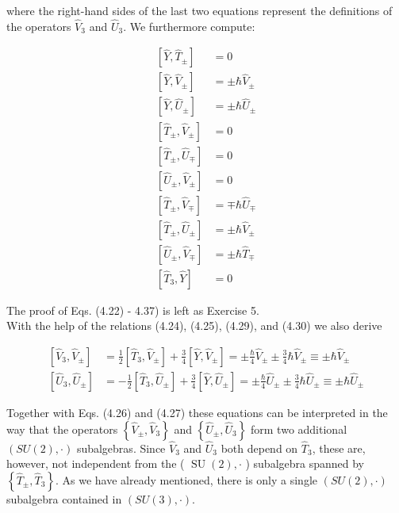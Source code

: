 \documentclass[10pt, letterpaper]{article}
\begin{document}
where the right-hand sides of the last two equations represent the definitions of the operators $\hat{V}_{3}$ and $\hat{U}_{3}$. We furthermore compute:

$$
\begin{aligned}
{\left[\hat{Y}, \hat{T}_{ \pm}\right] } & =0 \\
{\left[\hat{Y}, \hat{V}_{ \pm}\right] } & = \pm \hbar \hat{V}_{ \pm} \\
{\left[\hat{Y}, \hat{U}_{ \pm}\right] } & = \pm \hbar \hat{U}_{ \pm} \\
{\left[\hat{T}_{ \pm}, \hat{V}_{ \pm}\right] } & =0 \\
{\left[\hat{T}_{ \pm}, \hat{U}_{\mp}\right] } & =0 \\
{\left[\hat{U}_{ \pm}, \hat{V}_{ \pm}\right] } & =0 \\
{\left[\hat{T}_{ \pm}, \hat{V}_{\mp}\right] } & =\mp \hbar \hat{U}_{\mp} \\
{\left[\hat{T}_{ \pm}, \hat{U}_{ \pm}\right] } & = \pm \hbar \hat{V}_{ \pm} \\
{\left[\hat{U}_{ \pm}, \hat{V}_{\mp}\right] } & = \pm \hbar \hat{T}_{\mp} \\
{\left[\hat{T}_{3}, \hat{Y}\right] } & =0
\end{aligned}
$$

The proof of Eqs. (4.22) - 4.37) is left as Exercise 5.\\
With the help of the relations (4.24), (4.25), (4.29), and (4.30) we also derive

$$
\begin{aligned}
{\left[\hat{V}_{3}, \hat{V}_{ \pm}\right] } & =\frac{1}{2}\left[\hat{T}_{3}, \hat{V}_{ \pm}\right]+\frac{3}{4}\left[\hat{Y}, \hat{V}_{ \pm}\right]= \pm \frac{\hbar}{4} \hat{V}_{ \pm} \pm \frac{3}{4} \hbar \hat{V}_{ \pm} \equiv \pm \hbar \hat{V}_{ \pm} \\
{\left[\hat{U}_{3}, \hat{U}_{ \pm}\right] } & =-\frac{1}{2}\left[\hat{T}_{3}, \hat{U}_{ \pm}\right]+\frac{3}{4}\left[\hat{Y}, \hat{U}_{ \pm}\right]= \pm \frac{\hbar}{4} \hat{U}_{ \pm} \pm \frac{3}{4} \hbar \hat{U}_{ \pm} \equiv \pm \hbar \hat{U}_{ \pm}
\end{aligned}
$$

Together with Eqs. (4.26) and (4.27) these equations can be interpreted in the way that the operators $\left\{\hat{V}_{ \pm}, \hat{V}_{3}\right\}$ and $\left\{\hat{U}_{ \pm}, \hat{U}_{3}\right\}$ form two additional $(S U(2), \cdot)$ subalgebras. Since $\hat{V}_{3}$ and $\hat{U}_{3}$ both depend on $\hat{T}_{3}$, these are, however, not independent from the ( $\operatorname{SU}(2), \cdot$ ) subalgebra spanned by $\left\{\hat{T}_{ \pm}, \hat{T}_{3}\right\}$. As we have already mentioned, there is only a single $(S U(2), \cdot)$ subalgebra contained in $(S U(3), \cdot)$.
\end{document}
